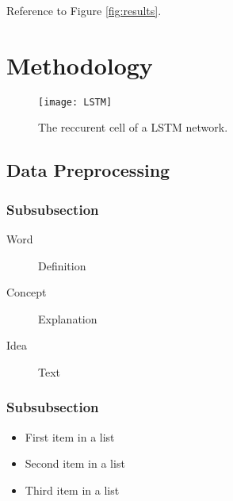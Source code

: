 \documentclass[fleqn,10pt]{SelfArx} %
\begin{document}
\lipsum[9] %


Reference to Figure \ref{fig:results}.


\section{Methodology}

\begin{figure*}[ht]\centering %
	\texttt{[image: LSTM]}
	\caption{The reccurent cell of a LSTM network.}
	\label{fig:view}
\end{figure*}

\lipsum[10] %

\subsection{Data Preprocessing}

\lipsum[11] %



\subsubsection{Subsubsection}

\lipsum[12] %

\begin{description}
	\item[Word] Definition
	\item[Concept] Explanation
	\item[Idea] Text
\end{description}

\subsubsection{Subsubsection}

\lipsum[13] %

\begin{itemize}[noitemsep] %
	\item First item in a list
	\item Second item in a list
	\item Third item in a list
\end{itemize}
\end{document}
